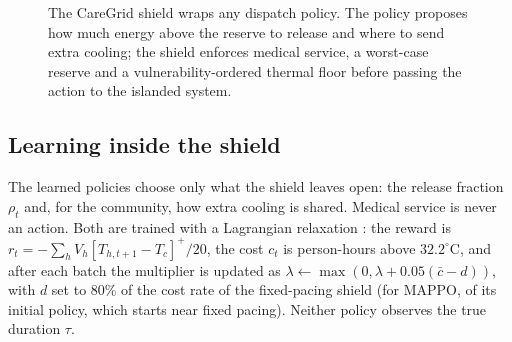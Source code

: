 \documentclass[conference]{IEEEtran}
\begin{document}
\begin{figure}[t]
\centering
{}
\caption{The CareGrid shield wraps any dispatch policy. The policy proposes how much energy above the reserve to release and where to send extra cooling; the shield enforces medical service, a worst-case reserve and a vulnerability-ordered thermal floor before passing the action to the islanded system.}
\label{fig:shield}
\end{figure}

\subsection{Learning inside the shield}
The learned policies choose only what the shield leaves open: the release fraction $\rho_t$ and, for the community, how extra cooling is shared. Medical service is never an action. Both are trained with a Lagrangian relaxation \cite{ray2019safety}: the reward is $r_t=-\sum_h V_h[T_{h,t+1}-T_c]^+/20$, the cost $c_t$ is person-hours above $32.2^\circ$C, and after each batch the multiplier is updated as $\lambda\leftarrow\max(0,\lambda+0.05(\bar c-d))$, with $d$ set to 80\% of the cost rate of the fixed-pacing shield (for MAPPO, of its initial policy, which starts near fixed pacing). Neither policy observes the true duration $\tau$.
\end{document}
